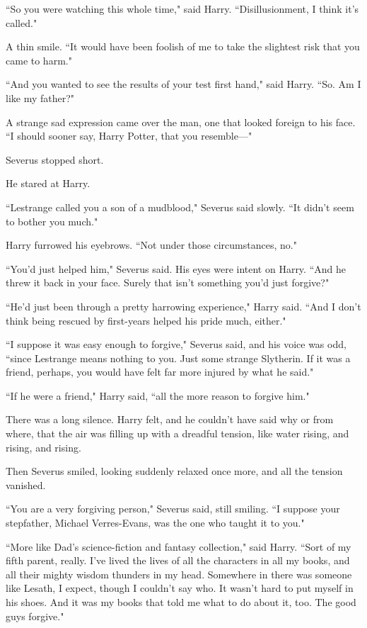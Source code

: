 ``So you were watching this whole time," said Harry. ``Disillusionment, I think it's called."

A thin smile. ``It would have been foolish of me to take the slightest risk that you came to harm."

``And you wanted to see the results of your test first hand," said Harry. ``So. Am I like my father?"

A strange sad expression came over the man, one that looked foreign to his face. ``I should sooner say, Harry Potter, that you resemble—"

Severus stopped short.

He stared at Harry.

``Lestrange called you a son of a mudblood," Severus said slowly. ``It didn't seem to bother you much."

Harry furrowed his eyebrows. ``Not under those circumstances, no."

``You'd just helped him," Severus said. His eyes were intent on Harry. ``And he threw it back in your face. Surely that isn't something you'd just forgive?"

``He'd just been through a pretty harrowing experience," Harry said. ``And I don't think being rescued by first-years helped his pride much, either."

``I suppose it was easy enough to forgive," Severus said, and his voice was odd, ``since Lestrange means nothing to you. Just some strange Slytherin. If it was a friend, perhaps, you would have felt far more injured by what he said."

``If he were a friend," Harry said, ``all the more reason to forgive him."

There was a long silence. Harry felt, and he couldn't have said why or from where, that the air was filling up with a dreadful tension, like water rising, and rising, and rising.

Then Severus smiled, looking suddenly relaxed once more, and all the tension vanished.

``You are a very forgiving person," Severus said, still smiling. ``I suppose your stepfather, Michael Verres-Evans, was the one who taught it to you."

``More like Dad's science-fiction and fantasy collection," said Harry. ``Sort of my fifth parent, really. I've lived the lives of all the characters in all my books, and all their mighty wisdom thunders in my head. Somewhere in there was someone like Lesath, I expect, though I couldn't say who. It wasn't hard to put myself in his shoes. And it was my books that told me what to do about it, too. The good guys forgive."

